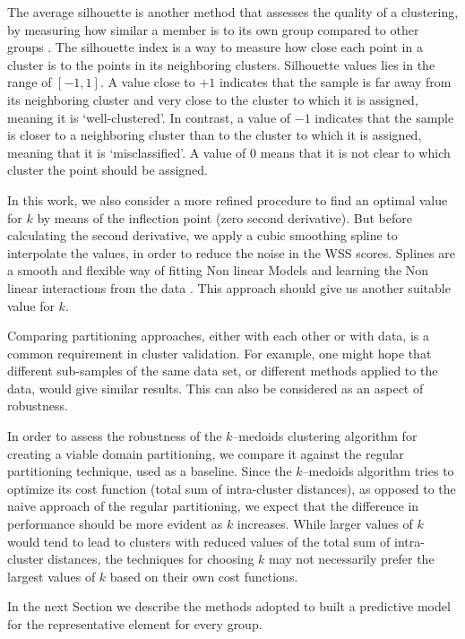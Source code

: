 The average silhouette is another method that assesses the quality of a clustering, by measuring how similar a member is to its own group compared to other groups \cite{Rousseeuw1987}. The silhouette index is a way to measure how close each point in a cluster is to the points in its neighboring clusters. 
Silhouette values lies in the range of $[-1, 1]$. A value close to $+1$ indicates that the sample is far away from its neighboring cluster and very close to the cluster to which it is assigned, meaning it is `well-clustered'. In contrast, a value of $-1$ indicates that the sample is closer to a neighboring cluster than to the cluster to which it is assigned, meaning that it is `misclassified'. A value of $0$ means that it is not clear to which cluster the point should be assigned. 

In this work, we also consider a more refined procedure to find an optimal value for $k$ by means of the inflection point (zero second derivative). But before calculating the second derivative, we apply a cubic smoothing spline to interpolate the values, in order to reduce the noise in the WSS scores. Splines are a smooth and flexible way of fitting Non linear Models and learning the Non linear interactions from the data \cite{HastieTF2009}. This approach should give us another suitable value for $k$.

Comparing partitioning approaches, either with each other or with data, is a common requirement in cluster validation. For example, one might hope that different sub-samples of the same data set, or different methods applied to the data, would give similar results. This can also be considered as an aspect of robustness.

In order to assess the robustness of the $k$--medoids clustering algorithm for creating a viable domain partitioning, we compare it against the regular partitioning technique, used as a baseline. Since the $k$--medoids algorithm tries to optimize its cost function (total sum of intra-cluster distances), as opposed to the naive approach of the regular partitioning, we expect that the difference in performance should be more evident as $k$ increases. While larger values of $k$ would tend to lead to clusters with reduced values of the total sum of intra-cluster distances, the techniques for choosing $k$ may not necessarily prefer the largest values of $k$ based on their own cost functions.

In the next Section we describe the methods adopted to built a predictive model for the representative element for every group.

